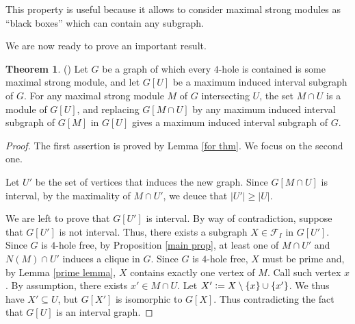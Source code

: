 \documentclass{article}
\theoremstyle{definition}
\newtheorem{thm}{Theorem}[section]
\newcommand{\defeq}{\vcentcolon=}
\begin{document}
    This property is useful because
    it allows to consider maximal
    strong modules as
    ``black boxes''
    which can contain any subgraph. 
    
    We are now ready to prove an
    important result.
    
    \begin{thm} (\cite{main}) \label{replacing thm}
        Let $G$ be a graph of which
        every $4$-hole is contained
        is some maximal strong module,
        and let $G\left[U\right]$ be a
        maximum induced interval
        subgraph of $G$.
        For any maximal strong module
        $M$ of $G$ intersecting $U$,
        the set $M \cap U$ is a module
        of $G\left[U\right]$, 
        and replacing $G\left[M \cap U \right]$ 
        by any maximum induced 
        interval subgraph of $G\left[M\right]$ 
        in $G\left[U\right]$ 
        gives a maximum induced interval
        subgraph of $G$.
    \end{thm}
    \begin{proof}
        The first assertion is proved
        by Lemma \ref{for thm}.
        We focus on the second one.

        Let $U'$  be the set of 
        vertices that induces the new graph.
        Since $G\left[M \cap U\right]$ is
        interval, by the maximality of
        $M \cap U'$, we deuce that
        $\left|U'\right| \geq \left|U\right|$.

        We are left to prove that
        $G\left[U'\right]$ is interval.
        By way of contradiction,
        suppose that $G\left[U'\right]$ 
        is not interval.
        Thus, there exists a
        subgraph $X \in \mathcal{F}_{I}$
        in $G\left[U'\right]$.
        Since $G$ is $4$-hole free, 
        by Proposition \ref{main prop},
        at least one of $M \cap U'$ 
        and $N\left(M\right) \cap U'$ 
        induces a clique in $G$.
        Since $G$ is $4$-hole free,
        $X$ must be prime and,
        by Lemma \ref{prime lemma},
        $X$ contains exactly
        one vertex of $M$.
        Call such vertex $x$.
        By assumption, 
        there exists $x' \in M \cap U$.
        Let $X' \defeq X \setminus \left\{x\right\} \cup \left\{x'\right\}$.
        We thus have $X' \subseteq U$,
        but $G\left[X'\right]$ is 
        isomorphic to $G\left[X\right]$.
        Thus contradicting the fact
        that $G\left[U\right]$ is an
        interval graph.
    \end{proof}
\end{document}
